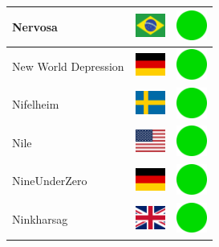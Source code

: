 \documentclass[12pt, a4paper, twoside]{report}
\begin{document}
\begin{center}
\begin{longtable}{|p{5cm}|p{2cm}|p{2cm}|}
 Nervosa                                                    & \includegraphics[width=1cm]{../img/flags/br} &   \includegraphics[width=1cm]{../likes/y} \\ \hline
 New World Depression                                       & \includegraphics[width=1cm]{../img/flags/de} &   \includegraphics[width=1cm]{../likes/y} \\ \hline
 Nifelheim                                                  & \includegraphics[width=1cm]{../img/flags/se} &   \includegraphics[width=1cm]{../likes/y} \\ \hline
 Nile                                                       & \includegraphics[width=1cm]{../img/flags/us} &   \includegraphics[width=1cm]{../likes/y} \\ \hline
 NineUnderZero                                              & \includegraphics[width=1cm]{../img/flags/de} &   \includegraphics[width=1cm]{../likes/y} \\ \hline
 Ninkharsag                                                 & \includegraphics[width=1cm]{../img/flags/gb} &   \includegraphics[width=1cm]{../likes/y} \\ \hline

\end{longtable}
\end{center}
\end{document}
